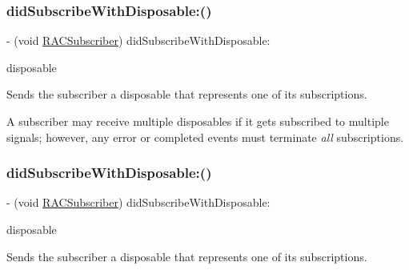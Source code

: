 \subsubsection{\texorpdfstring{did\+Subscribe\+With\+Disposable\+:()}{didSubscribeWithDisposable:()}\hspace{0.1cm}{\footnotesize\ttfamily [2/3]}}
{\footnotesize\ttfamily -\/ (void \mbox{\hyperlink{interface_r_a_c_subscriber}{R\+A\+C\+Subscriber}}) did\+Subscribe\+With\+Disposable\+: \begin{DoxyParamCaption}\item[{(\mbox{\hyperlink{interface_r_a_c_compound_disposable}{R\+A\+C\+Compound\+Disposable}} $\ast$)}]{disposable }\end{DoxyParamCaption}\hspace{0.3cm}{\ttfamily [required]}}

Sends the subscriber a disposable that represents one of its subscriptions.

A subscriber may receive multiple disposables if it gets subscribed to multiple signals; however, any error or completed events must terminate {\itshape all} subscriptions. \mbox{\label{protocol_r_a_c_subscriber_01-p_a44012a5efac0242765bfb0a98180654d}} 
\subsubsection{\texorpdfstring{did\+Subscribe\+With\+Disposable\+:()}{didSubscribeWithDisposable:()}\hspace{0.1cm}{\footnotesize\ttfamily [3/3]}}
{\footnotesize\ttfamily -\/ (void \mbox{\hyperlink{interface_r_a_c_subscriber}{R\+A\+C\+Subscriber}}) did\+Subscribe\+With\+Disposable\+: \begin{DoxyParamCaption}\item[{(\mbox{\hyperlink{interface_r_a_c_compound_disposable}{R\+A\+C\+Compound\+Disposable}} $\ast$)}]{disposable }\end{DoxyParamCaption}\hspace{0.3cm}{\ttfamily [required]}}

Sends the subscriber a disposable that represents one of its subscriptions.

